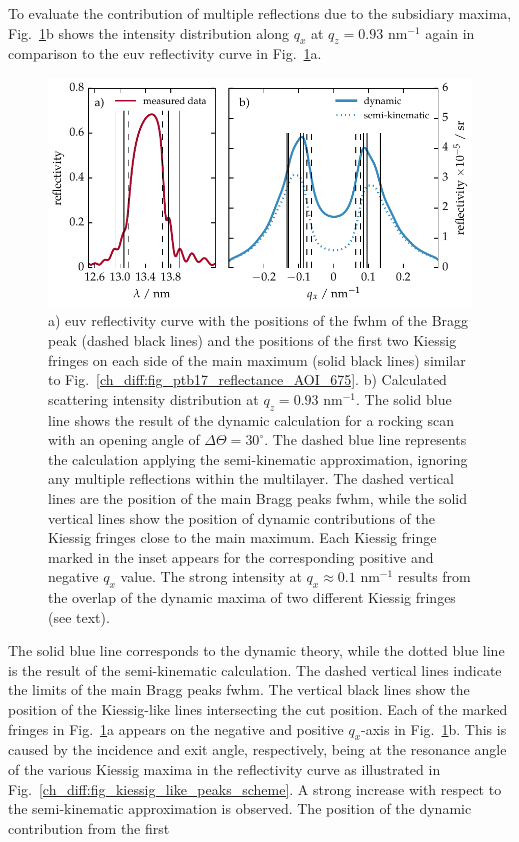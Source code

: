 To evaluate the contribution of multiple reflections due to the subsidiary maxima, Fig.~\ref{ch_diff:fig_kiessig_like_peak_along_qx}b shows the intensity distribution along $q_x$ at $q_z=0.93$ nm$^{-1}$ again in comparison to the \gls{euv} reflectivity curve in Fig.~\ref{ch_diff:fig_kiessig_like_peak_along_qx}a.
\begin{figure}[htbp]
        \includegraphics[width=\textwidth]{img/qx_kinematic_vs_dynamic}
        \caption{a) \gls{euv} reflectivity curve with the positions of the \gls{fwhm} of the Bragg peak (dashed black lines) and the positions of the first two Kiessig fringes on each side of the main maximum (solid black lines) similar to Fig.~\ref{ch_diff:fig_ptb17_reflectance_AOI_675}. b) Calculated scattering intensity distribution at $q_z=0.93$ nm$^{-1}$. The solid blue line shows the result of the dynamic calculation for a rocking scan with an opening angle of $\Delta\Theta=30^\circ$. The dashed blue line represents the calculation applying the semi-kinematic approximation, ignoring any multiple reflections within the multilayer. The dashed vertical lines are the position of the main Bragg peaks \gls{fwhm}, while the solid vertical lines show the position of dynamic contributions of the Kiessig fringes close to the main maximum. Each Kiessig fringe marked in the inset appears for the corresponding positive and negative $q_x$ value. The strong intensity at $q_x\approx0.1$ nm$^{-1}$ results from the overlap of the dynamic maxima of two different Kiessig fringes (see text).} \label{ch_diff:fig_kiessig_like_peak_along_qx} 
\end{figure}
The solid blue line corresponds to the dynamic theory, while the dotted blue line is the result of the semi-kinematic calculation. The dashed vertical lines indicate the limits of the main Bragg peaks \gls{fwhm}. The vertical black lines show the position of the Kiessig-like lines intersecting the cut position. Each of the marked fringes in Fig.~\ref{ch_diff:fig_kiessig_like_peak_along_qx}a appears on the negative and positive $q_x$-axis in Fig.~\ref{ch_diff:fig_kiessig_like_peak_along_qx}b. This is caused by the incidence and exit angle, respectively, being at the resonance angle of the various Kiessig maxima in the reflectivity curve as illustrated in Fig.~\ref{ch_diff:fig_kiessig_like_peaks_scheme}. A strong increase with respect to the semi-kinematic approximation is observed. The position of the dynamic contribution from the first 
